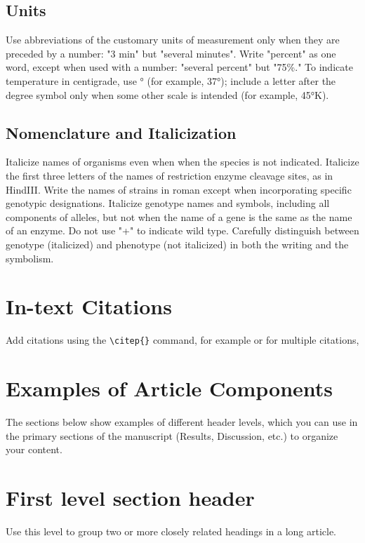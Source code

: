 \documentclass[9pt,twocolumn,twoside]{gsajnl}
\begin{document}
\subsection*{Units} Use abbreviations of the customary units of measurement only when they are preceded by a number: "3 min" but "several minutes". Write "percent" as one word, except when used with a number: "several percent" but "75\%." To indicate temperature in centigrade, use ° (for example, 37°); include a letter after the degree symbol only when some other scale is intended (for example, 45°K).

\subsection*{Nomenclature and Italicization} Italicize names of organisms even when  when the species is not indicated.  Italicize the first three letters of the names of restriction enzyme cleavage sites, as in HindIII. Write the names of strains in roman except when incorporating specific genotypic designations. Italicize genotype names and symbols, including all components of alleles, but not when the name of a gene is the same as the name of an enzyme. Do not use "+" to indicate wild type. Carefully distinguish between genotype (italicized) and phenotype (not italicized) in both the writing and the symbolism.

\section*{In-text Citations}

Add citations using the \verb|\citep{}| command, for example \citep{neher2013genealogies} or for multiple citations, \citep{neher2013genealogies, rodelsperger2014characterization}

\section*{Examples of Article Components}
\label{sec:examples}

The sections below show examples of different header levels, which you can use in the primary sections of the manuscript (Results, Discussion, etc.) to organize your content.

\section*{First level section header}

Use this level to group two or more closely related headings in a long article.
\end{document}
